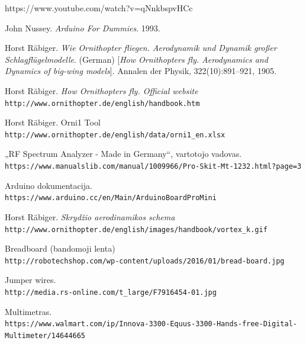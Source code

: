 \documentclass{VUMIFPSkursinis}
\begin{document}
https://www.youtube.com/watch?v=qNnkbspvHCc

\begin{thebibliography}{9}
	John Nussey.
	\textit{Arduino For Dummies}. 
	1993.
	
	Horst Räbiger. 
	\textit{Wie Ornithopter fliegen. Aerodynamik und Dynamik großer Schlagflügelmodelle}. (German) 
	[\textit{How Ornithopters fly. Aerodynamics and Dynamics of big-wing models}]. 
	Annalen der Physik, 322(10):891–921, 1905.
	
	Horst Räbiger. 
	\textit{How Ornithopters fly. Official website}
	\\\texttt{http://www.ornithopter.de/english/handbook.htm}
	
	Horst Räbiger. Orni1 Tool
	\\\texttt{http://www.ornithopter.de/english/data/orni1\_en.xlsx}
	
	„RF Spectrum Analyzer - Made in Germany“, vartotojo vadovas.
	\\\texttt{https://www.manualslib.com/manual/1009966/Pro-Skit-Mt-1232.html?page=3}
	
	Arduino dokumentacija.
	\\\texttt{https://www.arduino.cc/en/Main/ArduinoBoardProMini}
	
	Horst Räbiger.
	\textit{Skrydžio aerodinamikos schema}\\
	\texttt{http://www.ornithopter.de/english/images/handbook/vortex\_k.gif}
	
	Breadboard (bandomoji lenta)\\
	\texttt{http://robotechshop.com/wp-content/uploads/2016/01/bread-board.jpg}
	
	Jumper wires.\\
	\texttt{http://media.rs-online.com/t\_large/F7916454-01.jpg}
	
	Multimetras.\\
	\texttt{https://www.walmart.com/ip/Innova-3300-Equus-3300-Hands-free-Digital-Multimeter/14644665}
	
	
\end{thebibliography}
\end{document}
